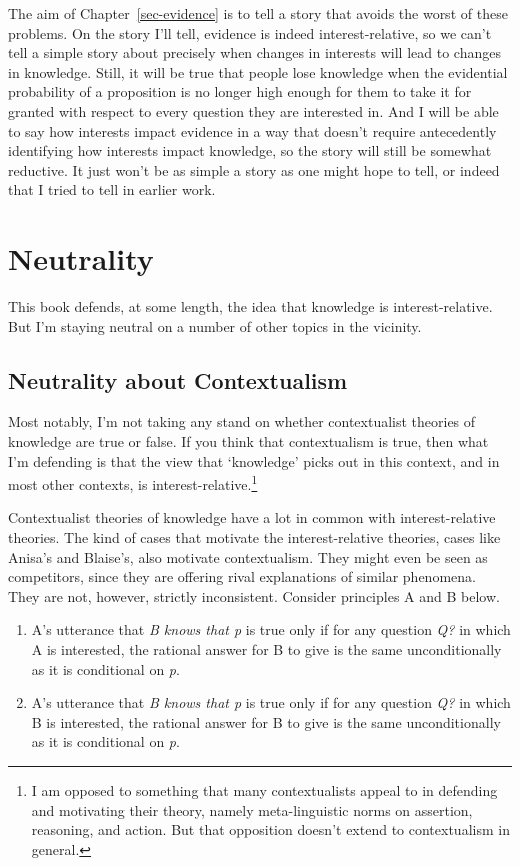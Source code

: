 \documentclass[
  12pt,
  letterpaper,
]{scrbook}
\providecommand{\tightlist}{%
  \setlength{\itemsep}{0pt}\setlength{\parskip}{0pt}}\usepackage{longtable,booktabs,array}
\begin{document}
The aim of Chapter~\ref{sec-evidence} is to tell a story that avoids the
worst of these problems. On the story I'll tell, evidence is indeed
interest-relative, so we can't tell a simple story about precisely when
changes in interests will lead to changes in knowledge. Still, it will
be true that people lose knowledge when the evidential probability of a
proposition is no longer high enough for them to take it for granted
with respect to every question they are interested in. And I will be
able to say how interests impact evidence in a way that doesn't require
antecedently identifying how interests impact knowledge, so the story
will still be somewhat reductive. It just won't be as simple a story as
one might hope to tell, or indeed that I tried to tell in earlier work.

\section{Neutrality}\label{sec-neutrality}

This book defends, at some length, the idea that knowledge is
interest-relative. But I'm staying neutral on a number of other topics
in the vicinity.

\subsection{Neutrality about
Contextualism}\label{sec-neutrality-contextualism}

Most notably, I'm not taking any stand on whether contextualist theories
of knowledge are true or false. If you think that contextualism is true,
then what I'm defending is that the view that `knowledge' picks out in
this context, and in most other contexts, is
interest-relative.\footnote{I am opposed to something that many
  contextualists appeal to in defending and motivating their theory,
  namely meta-linguistic norms on assertion, reasoning, and action. But
  that opposition doesn't extend to contextualism in general.}

Contextualist theories of knowledge have a lot in common with
interest-relative theories. The kind of cases that motivate the
interest-relative theories, cases like Anisa's and Blaise's, also
motivate contextualism. They might even be seen as competitors, since
they are offering rival explanations of similar phenomena. They are not,
however, strictly inconsistent. Consider principles A and B below.

\begin{enumerate}
\def\labelenumi{\Alph{enumi}.}
\tightlist
\item
  A's utterance that \emph{B knows that p} is true only if for any
  question \emph{Q?} in which A is interested, the rational answer for B
  to give is the same unconditionally as it is conditional on \emph{p}.
\item
  A's utterance that \emph{B knows that p} is true only if for any
  question \emph{Q?} in which B is interested, the rational answer for B
  to give is the same unconditionally as it is conditional on \emph{p}.
\end{enumerate}
\end{document}
